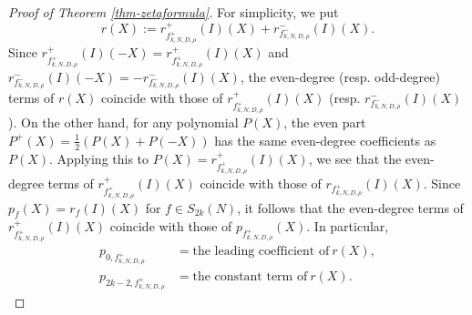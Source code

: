 \documentclass[12pt]{amsart}
\numberwithin{equation}{section}
\theoremstyle{definition}
\begin{document}
\begin{proof}[Proof of Theorem \ref{thm-zetaformula}]
    For simplicity, we put
    $$r(X):=r_{f_{k,N,D,\rho}^{+}}^{+}(I)(X)+r_{f_{k,N,D,\rho}^{-}}^{-}(I)(X).$$
    Since $r_{f_{k,N,D,\rho}^{+}}^{+}(I)(-X)=r_{f_{k,N,D,\rho}^{+}}^{+}(I)(X)$ and $r_{f_{k,N,D,\rho}^{-}}^{-}(I)(-X)=-r_{f_{k,N,D,\rho}^{-}}^{-}(I)(X)$, the even-degree (resp. odd-degree) terms of $r(X)$ coincide with those of $r_{f_{k,N,D,\rho}^{+}}^{+}(I)(X)$ (resp. $r_{f_{k,N,D,\rho}^{-}}^{-}(I)(X)$). On the other hand, for any polynomial $P(X)$, the even part $P^{+}(X)=\frac{1}{2}(P(X)+P(-X))$ has the same even-degree coefficients as $P(X)$. Applying this to $P(X)=r_{f_{k,N,D,\rho}^{+}}^{+}(I)(X)$, we see that the even-degree terms of
    $r_{f_{k,N,D,\rho}^{+}}^{+}(I)(X)$ coincide with those of $r_{f_{k,N,D,\rho}^{+}}(I)(X)$.
    Since $p_{f}(X)=r_{f}(I)(X)$ for $f\in S_{2k}(N)$, it follows that the even-degree terms of
    $r_{f_{k,N,D,\rho}^{+}}^{+}(I)(X)$ coincide with those of $p_{f_{k,N,D,\rho}^{+}}(X)$. In particular,
    \begin{align*}
        p_{0,f_{k,N,D,\rho}^{+}}&=\text{the leading coefficient of}~r(X),\\
        p_{2k-2,f_{k,N,D,\rho}^{+}}&=\text{the constant term of}~r(X).
    \end{align*}


\end{proof}
\end{document}
